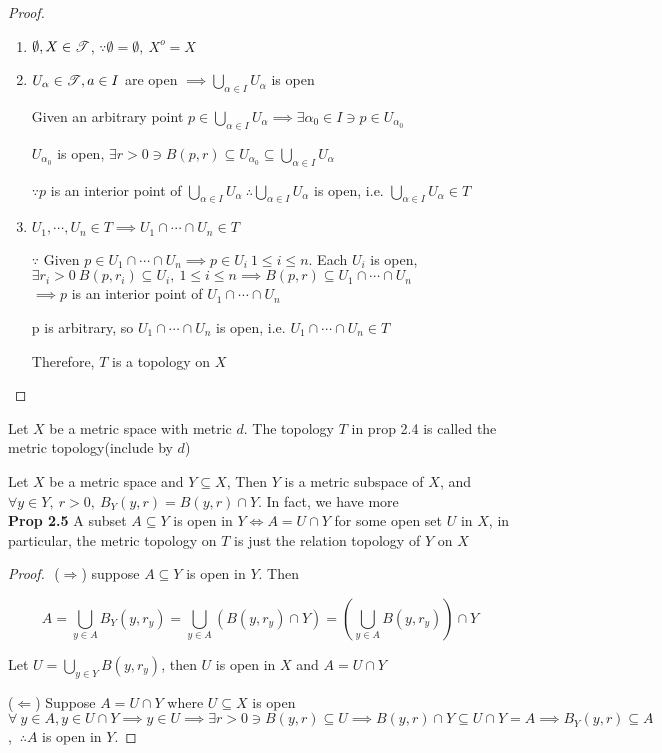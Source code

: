 \begin{proof}$ $
	\begin{enumerate}[wide,label = (\textbf{\roman*})]
		\item $\emptyset, X \in \mathscr{T}$, $\because \emptyset = \emptyset,~X^o = X$
		\item $U_{\alpha} \in \mathscr{T}, a \in I$ are open $\implies \bigcup_{\alpha \in I}U_{\alpha}$ is open
		
		Given an arbitrary point $p \in \bigcup_{\alpha \in I}U_{\alpha} \implies \exists \alpha_0 \in I \ni p \in U_{\alpha_0}$
		
		$U_{\alpha_0}$ is open, $\exists r > 0 \ni B(p,r) \subseteq U_{\alpha_0} \subseteq \bigcup_{\alpha \in I}U_{\alpha}$
		
		$\because p$ is an interior point of $\bigcup_{\alpha \in I}U_{\alpha}~\therefore \bigcup_{\alpha \in I}U_{\alpha}$ is open, i.e. $\bigcup_{\alpha \in I}U_{\alpha} \in T$
		\item $U_1,\cdots,U_n \in T \implies U_1 \cap \cdots \cap U_n \in T$
		 
		$\because$ Given $p \in U_1 \cap \cdots \cap U_n \implies p \in U_i~1\leq i\leq n$. Each $U_i$ is open, $\exists r_i > 0~B(p,r_i) \subseteq U_i,~1\leq i \leq n \implies B(p,r) \subseteq U_1 \cap \cdots \cap U_n$\\
		$\implies p$ is an interior point of $U_1 \cap \cdots \cap U_n$
		
		p is arbitrary, so $U_1 \cap \cdots \cap U_n$ is open, i.e. $U_1 \cap \cdots \cap U_n \in T$
		
		Therefore, $T$ is a topology on $X$
	\end{enumerate}
\end{proof}

\begin{defn}
	Let $X$ be a metric space with metric $d$. The topology $T$ in prop 2.4 is called the metric topology(include by $d$)
\end{defn}

Let $X$ be a metric space and $Y \subseteq X$, Then $Y$ is a metric subspace of $X$, and $\forall y \in Y,~r > 0,~B_Y(y,r) = B(y,r) \cap Y$. In fact, we have more\\

\textbf{Prop 2.5} A subset $A \subseteq Y$ is open in $Y \Leftrightarrow A = U \cap Y$ for some open set $U$ in $X$, in particular, the metric topology on $T$ is just the relation topology of $Y$ on $X$

\begin{proof}$ $
	($\Rightarrow$) suppose $A \subseteq Y$ is open in $Y$. Then
	
	$$A = \bigcup_{y \in A}B_{Y}(y,r_y) = \bigcup_{y \in A}(B(y,r_y)\cap Y) = (\bigcup_{y \in A}B(y,r_y))\cap Y$$
	
	Let $U = \bigcup_{y \in Y}B(y,r_y)$, then $U$ is open in $X$ and $A = U \cap Y$
	
	($\Leftarrow$) Suppose $A = U \cap Y$ where $U \subseteq X$ is open $\forall ~ y \in A, y\in U \cap Y \implies y \in U \implies \exists r > 0 \ni B(y,r) \subseteq U \implies B(y,r) \cap Y \subseteq U \cap Y = A \implies B_Y(y,r) \subseteq A$, $~\therefore A$ is open in $Y$.
\end{proof} 

